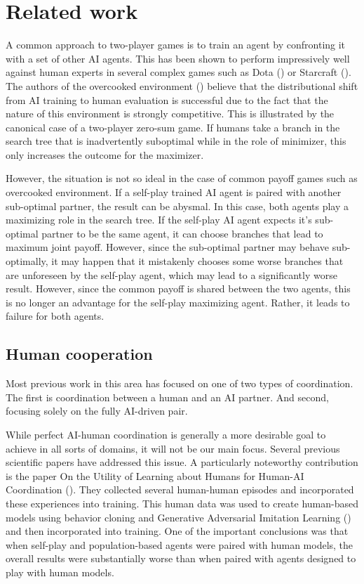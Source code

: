 \chapter{Related work}\label{RelatedWorkChapter}

A common approach to two-player games is to train an agent by confronting it with a set of other AI agents.
This has been shown to perform impressively well against human experts in several complex games such as Dota (\cite{DotaOpenFive}) or Starcraft (\cite{Starcraft}).
The authors of the overcooked environment (\cite{carroll2020utility}) believe that the distributional shift from AI training to human evaluation is successful due to the fact that the nature of this environment is strongly competitive.
This is illustrated by the canonical case of a two-player zero-sum game.
If humans take a branch in the search tree that is inadvertently suboptimal while in the role of minimizer, this only increases the outcome for the maximizer.

However, the situation is not so ideal in the case of common payoff games such as overcooked environment.
If a self-play trained AI agent is paired with another sub-optimal partner, the result can be abysmal. 
In this case, both agents play a maximizing role in the search tree. 
If the self-play AI agent expects it's sub-optimal partner to be the same agent, it can choose branches that lead to maximum joint payoff.
However, since the sub-optimal partner may behave sub-optimally, it may happen that it mistakenly chooses some worse branches that are unforeseen by the self-play agent, which may lead to a significantly worse result.
However, since the common payoff is shared between the two agents, this is no longer an advantage for the self-play maximizing agent.
Rather, it leads to failure for both agents.

\section{Human cooperation}
Most previous work in this area has focused on one of two types of coordination. 
The first is coordination between a human and an AI partner. 
And second, focusing solely on the fully AI-driven pair.


\par

While perfect AI-human coordination is generally a more desirable goal to achieve in all sorts of domains, it will not be our main focus.  
Several previous scientific papers have addressed this issue. A particularly noteworthy contribution is the paper 
On the Utility of Learning about Humans for Human-AI Coordination (\cite{carroll2020utility}). 
They collected several human-human episodes and incorporated these experiences into training.
This human data was used to create human-based models using behavior cloning and Generative Adversarial Imitation Learning (\cite{Ho2016GenerativeAI}) and then incorporated into training.
One of the important conclusions was that when self-play and population-based agents were paired with human models, the overall results were substantially worse than when paired with agents designed to play with human models.

